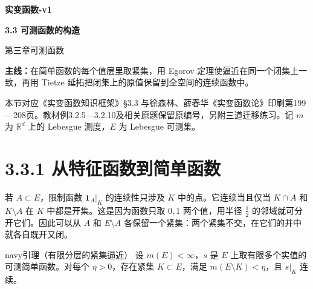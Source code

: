 \documentclass[11pt,a4paper]{article}
\begin{document}
\begin{center}{\LARGE\bfseries 实变函数-v1\par}\vspace{7pt}
{\Large\bfseries 3.3 可测函数的构造\par}\vspace{6pt}
{第三章\quad 可测函数\par}\end{center}
\textbf{主线：}在简单函数的每个值层里取紧集，用 Egorov 定理使逼近在同一个闭集上一致，再用 Tietze 延拓把闭集上的原值保留到全空间的连续函数中。
\begin{center}
\end{center}
本节对应《实变函数知识框架》\S3.3 与徐森林、薛春华《实变函数论》印刷第199—208页。教材例3.2.5—3.2.10及相关原题保留原编号，另附三道迁移练习。记 $m$ 为 $\mathbb R^d$ 上的 Lebesgue 测度，$E$ 为 Lebesgue 可测集。
\begingroup\small\setlength{\parskip}{0pt}\renewcommand{\addvspace}[1]{\vskip 2pt}\tableofcontents\endgroup

\section[\S{}3.3.1
从特征函数到简单函数]{3.3.1
从特征函数到简单函数}\label{ux4eceux7279ux5f81ux51fdux6570ux5230ux7b80ux5355ux51fdux6570}

若 \(A\subset E\)，限制函数 \(\mathbf1_A|_K\) 的连续性只涉及 \(K\)
中的点。它连续当且仅当 \(K\cap A\) 和 \(K\setminus A\) 在 \(K\)
中都是开集。这是因为函数只取 \(0,1\) 两个值，用半径 \(\frac{1}{2}\)
的邻域就可分开它们。因此可以从 \(A\) 和 \(E\setminus A\)
各保留一个紧集：两个紧集不交，在它们的并中就各自既开又闭。

\begin{sboxenv}{navy}{引理（有限分层的紧集逼近）}
设 \(m(E)<\infty\)，\(s\) 是 \(E\)
上取有限多个实值的可测简单函数。对每个 \(\eta>0\)，存在紧集
\(K\subset E\)，满足 \(m(E\setminus K)<\eta\)，且 \(s|_K\) 连续。

\end{sboxenv}
\end{document}
